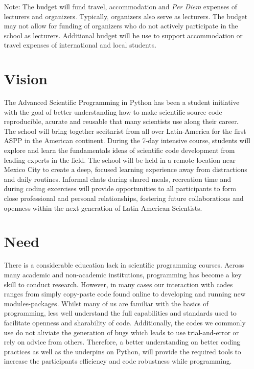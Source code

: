 \documentclass{article}[11pt]
\begin{document}
Note: The budget will fund travel, accommodation and \textit{Per Diem} expenses 
of lecturers and organizers. Typically, organizers also serve as lecturers. The 
budget may not allow for funding of organizers who do not actively participate 
in the school as lecturers. Additional budget will be use to support 
accommodation or travel expenses of international and local students.

\section*{Vision}
The Advanced Scientific Programming in Python has been a student initiative 
with the goal of better understanding how to make scientific source code 
reproducible, acurate and reusable that many scientists use along their career. 
The school will bring together sceitnrist from all over Latin-America for the
first ASPP in the American continent. During the 7-day intensive course, 
students will explore and learn the fundamentals ideas of scientific code 
development from leading experts in the field. The school will be held in a 
remote location near Mexico City to create a deep, focused learning experience 
away from distractions and daily routines. Informal chats during shared meals, 
recreation time and during coding excercises will provide opportunities to all 
participants to form close professional and personal relationships, fostering 
future collaborations and openness within the next generation of Latin-American 
Scientists.

\section*{Need}
There is a considerable education lack in scientific programming courses. Across
many academic and non-academic institutions, programming has become a key skill
to conduct research. However, in many cases our interaction with codes ranges 
from simply copy-paste code found online to developing and running new modules-packages. 
Whilst many of us are familiar with the basics of programming, less well understand 
the full capabilities and standards used to facilitate openness and sharability of code. 
Additionally, the codes we commonly use do not aliviate the generation of bugs which 
leads to use trial-and-error or rely on advice from others. Therefore, a better 
understanding on better coding practices as well as the underpins on Python, 
will provide the required tools to increase the participants efficiency and code 
robustness while programming.
\end{document}
